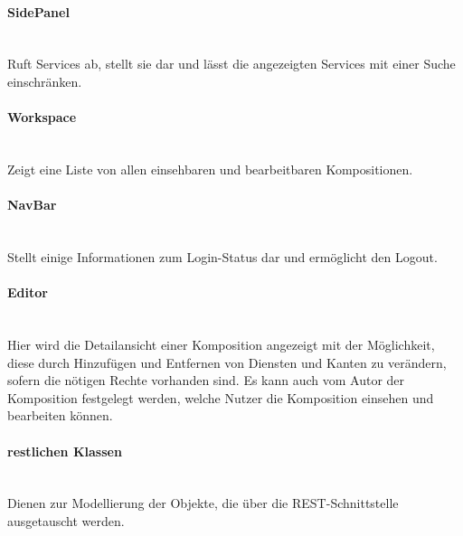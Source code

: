 \paragraph{SidePanel}\mbox{}\\
Ruft Services ab, stellt sie dar und lässt die angezeigten Services mit einer Suche einschränken. 
\paragraph{Workspace}\mbox{}\\
Zeigt eine Liste von allen einsehbaren und bearbeitbaren Kompositionen. 
\paragraph{NavBar}\mbox{}\\
Stellt einige Informationen zum Login-Status dar und ermöglicht den Logout.
\paragraph{Editor}\mbox{}\\
Hier wird die Detailansicht einer Komposition angezeigt mit der Möglichkeit, diese durch Hinzufügen und Entfernen von
Diensten und Kanten zu verändern, sofern die nötigen Rechte vorhanden sind. Es kann auch vom Autor der Komposition festgelegt
werden, welche Nutzer die Komposition einsehen und bearbeiten können. 
\paragraph{restlichen Klassen}\mbox{}\\
Dienen zur Modellierung der Objekte, die über die REST-Schnittstelle ausgetauscht werden. 
